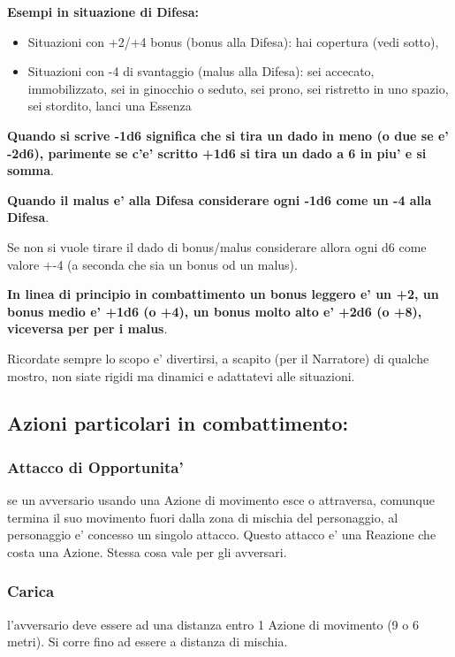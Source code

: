 \documentclass[a4paper,11pt,twoside,openany]{book}
\begin{document}
	\textbf{Esempi in situazione di Difesa:}
	
	\begin{itemize}
		\item Situazioni con +2/+4 bonus (bonus alla Difesa): hai copertura (vedi sotto),
		
		\item Situazioni con -4 di svantaggio (malus alla Difesa): sei accecato, immobilizzato, sei in ginocchio o seduto, sei prono, sei ristretto in uno spazio, sei stordito, lanci una Essenza 
	\end{itemize}
	
	\textbf{Quando si scrive -1d6 significa che si tira un dado in meno (o due se e' -2d6), parimente se c'e' scritto +1d6 si tira un dado a 6 in piu' e si somma}.
	
	\textbf{Quando il malus e' alla Difesa considerare ogni -1d6 come un -4 alla Difesa}.
	
	Se non si vuole tirare il dado di bonus/malus considerare allora ogni d6 come valore +-4 (a seconda che sia un bonus od un malus).
	
	\textbf{In linea di principio in combattimento un bonus leggero e' un +2, un bonus medio e' +1d6 (o +4), un bonus molto alto e' +2d6 (o +8), viceversa per per i malus}.
	
	\bigskip
	Ricordate sempre lo scopo e' divertirsi, a scapito (per il Narratore) di qualche mostro, non siate rigidi ma dinamici e adattatevi alle situazioni.
	
	\subsection{Azioni particolari in combattimento:}
	
	\subsubsection{Attacco di Opportunita'} se un avversario usando una Azione di movimento esce o attraversa, comunque termina il suo movimento fuori dalla zona di mischia del personaggio, al personaggio e' concesso un singolo attacco. Questo attacco e' una Reazione che costa una Azione. Stessa cosa vale per gli avversari.
	
	\subsubsection{Carica} l'avversario deve essere ad una distanza entro 1 Azione di movimento (9 o 6 metri). Si corre fino ad essere a distanza di mischia.
	
\end{document}
